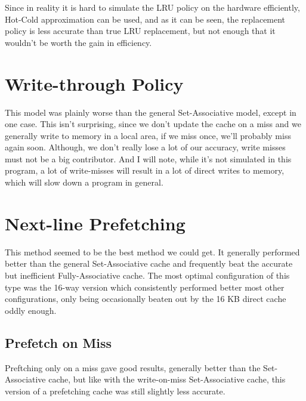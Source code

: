 \documentclass[12pt]{article}
\begin{document}
Since in reality it is hard to simulate the LRU policy on the hardware
efficiently, Hot-Cold approximation can be used, and as it can be seen, the
replacement policy is less accurate than true LRU replacement, but not enough
that it wouldn't be worth the gain in efficiency.

\section{Write-through Policy}

This model was plainly worse than the general Set-Associative model, except in
one case. This isn't surprising, since we don't update the cache on a miss and
we generally write to memory in a local area, if we miss once, we'll probably
miss again soon. Although, we don't really lose a lot of our accuracy, write
misses must not be a big contributor. And I will note, while it's not simulated
in this program, a lot of write-misses will result in a lot of direct writes to
memory, which will slow down a program in general.

\section{Next-line Prefetching}

This method seemed to be the best method we could get. It generally performed
better than the general Set-Associative cache and frequently beat the accurate
but inefficient Fully-Associative cache. The most optimal configuration of this
type was the 16-way version which consistently performed better most other
configurations, only being occasionally beaten out by the 16 KB direct cache
oddly enough.

\subsection{Prefetch on Miss}

Preftching only on a miss gave good results, generally better than the
Set-Associative cache, but like with the write-on-miss Set-Associative cache,
this version of a prefetching cache was still slightly less accurate.
\end{document}
